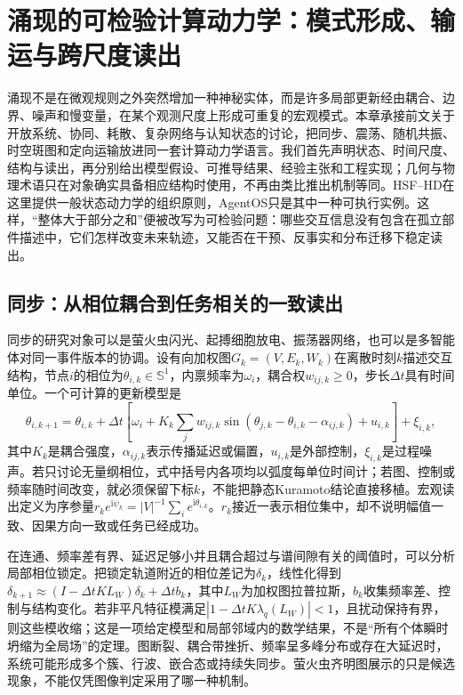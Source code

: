 \chapter{涌现的可检验计算动力学：模式形成、输运与跨尺度读出}
\label{chp:geometry_of_emergence}

涌现不是在微观规则之外突然增加一种神秘实体，而是许多局部更新经由耦合、边界、噪声和慢变量，在某个观测尺度上形成可重复的宏观模式。本章承接前文关于开放系统、协同、耗散、复杂网络与认知状态的讨论，把同步、震荡、随机共振、时空斑图和定向运输放进同一套计算动力学语言。我们首先声明状态、时间尺度、结构与读出，再分别给出模型假设、可推导结果、经验主张和工程实现；几何与物理术语只在对象确实具备相应结构时使用，不再由类比推出机制等同。HSF--HD在这里提供一般状态动力学的组织原则，AgentOS只是其中一种可执行实例。这样，“整体大于部分之和”便被改写为可检验问题：哪些交互信息没有包含在孤立部件描述中，它们怎样改变未来轨迹，又能否在干预、反事实和分布迁移下稳定读出。

\section{同步：从相位耦合到任务相关的一致读出}
\label{sec:emergence_sync}

同步的研究对象可以是萤火虫闪光、起搏细胞放电、振荡器网络，也可以是多智能体对同一事件版本的协调。设有向加权图$G_k=(V,E_k,W_k)$在离散时刻$k$描述交互结构，节点$i$的相位为$\theta_{i,k}\in\mathbb S^1$，内禀频率为$\omega_i$，耦合权$w_{ij,k}\geq0$，步长$\Delta t$具有时间单位。一个可计算的更新模型是
\[
\theta_{i,k+1}=\theta_{i,k}+\Delta t\left[\omega_i+K_k\sum_j w_{ij,k}\sin(\theta_{j,k}-\theta_{i,k}-\alpha_{ij,k})+u_{i,k}\right]+\xi_{i,k},
\]
其中$K_k$是耦合强度，$\alpha_{ij,k}$表示传播延迟或偏置，$u_{i,k}$是外部控制，$\xi_{i,k}$是过程噪声。若只讨论无量纲相位，式中括号内各项均以弧度每单位时间计；若图、控制或频率随时间改变，就必须保留下标$k$，不能把静态Kuramoto结论直接移植。宏观读出定义为序参量$r_ke^{\mathrm i\psi_k}=|V|^{-1}\sum_i e^{\mathrm i\theta_{i,k}}$。$r_k$接近一表示相位集中，却不说明幅值一致、因果方向一致或任务已经成功。

在连通、频率差有界、延迟足够小并且耦合超过与谱间隙有关的阈值时，可以分析局部相位锁定。把锁定轨道附近的相位差记为$\delta_k$，线性化得到$\delta_{k+1}\approx(I-\Delta t K L_W)\delta_k+\Delta t b_k$，其中$L_W$为加权图拉普拉斯，$b_k$收集频率差、控制与结构变化。若非平凡特征模满足$|1-\Delta t K\lambda_q(L_W)|<1$，且扰动保持有界，则这些模收缩；这是一项给定模型和局部邻域内的数学结果，不是“所有个体瞬时坍缩为全局场”的定理。图断裂、耦合带挫折、频率呈多峰分布或存在大延迟时，系统可能形成多个簇、行波、嵌合态或持续失同步。萤火虫齐明图展示的只是候选现象，不能仅凭图像判定采用了哪一种机制。

